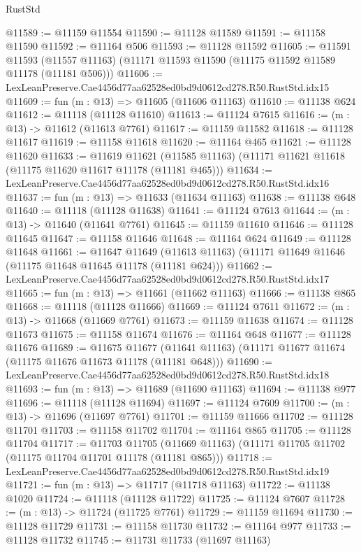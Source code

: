 \begin{lexlean}{RustStd}
\begin{coremodule}
@11589 := @11159 @11554
@11590 := @11128 @11589
@11591 := @11158 @11590
@11592 := @11164 @506
@11593 := @11128 @11592
@11605 := @11591
    @11593
    (@11557 @11163)
    (@11171 @11593 @11590 (@11175 @11592 @11589 @11178 (@11181 @506)))
@11606 := LexLeanPreserve.Cae4456d77aa62528ed0bd9d0612cd278.R50.RustStd.idx15
@11609 := fun (m : @13) => @11605 (@11606 @11163)
@11610 := @11138 @624
@11612 := @11118 (@11128 @11610)
@11613 := @11124 @7615
@11616 := (m : @13) -> @11612 (@11613 @7761)
@11617 := @11159 @11582
@11618 := @11128 @11617
@11619 := @11158 @11618
@11620 := @11164 @465
@11621 := @11128 @11620
@11633 := @11619
    @11621
    (@11585 @11163)
    (@11171 @11621 @11618 (@11175 @11620 @11617 @11178 (@11181 @465)))
@11634 := LexLeanPreserve.Cae4456d77aa62528ed0bd9d0612cd278.R50.RustStd.idx16
@11637 := fun (m : @13) => @11633 (@11634 @11163)
@11638 := @11138 @648
@11640 := @11118 (@11128 @11638)
@11641 := @11124 @7613
@11644 := (m : @13) -> @11640 (@11641 @7761)
@11645 := @11159 @11610
@11646 := @11128 @11645
@11647 := @11158 @11646
@11648 := @11164 @624
@11649 := @11128 @11648
@11661 := @11647
    @11649
    (@11613 @11163)
    (@11171 @11649 @11646 (@11175 @11648 @11645 @11178 (@11181 @624)))
@11662 := LexLeanPreserve.Cae4456d77aa62528ed0bd9d0612cd278.R50.RustStd.idx17
@11665 := fun (m : @13) => @11661 (@11662 @11163)
@11666 := @11138 @865
@11668 := @11118 (@11128 @11666)
@11669 := @11124 @7611
@11672 := (m : @13) -> @11668 (@11669 @7761)
@11673 := @11159 @11638
@11674 := @11128 @11673
@11675 := @11158 @11674
@11676 := @11164 @648
@11677 := @11128 @11676
@11689 := @11675
    @11677
    (@11641 @11163)
    (@11171 @11677 @11674 (@11175 @11676 @11673 @11178 (@11181 @648)))
@11690 := LexLeanPreserve.Cae4456d77aa62528ed0bd9d0612cd278.R50.RustStd.idx18
@11693 := fun (m : @13) => @11689 (@11690 @11163)
@11694 := @11138 @977
@11696 := @11118 (@11128 @11694)
@11697 := @11124 @7609
@11700 := (m : @13) -> @11696 (@11697 @7761)
@11701 := @11159 @11666
@11702 := @11128 @11701
@11703 := @11158 @11702
@11704 := @11164 @865
@11705 := @11128 @11704
@11717 := @11703
    @11705
    (@11669 @11163)
    (@11171 @11705 @11702 (@11175 @11704 @11701 @11178 (@11181 @865)))
@11718 := LexLeanPreserve.Cae4456d77aa62528ed0bd9d0612cd278.R50.RustStd.idx19
@11721 := fun (m : @13) => @11717 (@11718 @11163)
@11722 := @11138 @1020
@11724 := @11118 (@11128 @11722)
@11725 := @11124 @7607
@11728 := (m : @13) -> @11724 (@11725 @7761)
@11729 := @11159 @11694
@11730 := @11128 @11729
@11731 := @11158 @11730
@11732 := @11164 @977
@11733 := @11128 @11732
@11745 := @11731
    @11733
    (@11697 @11163)

\end{coremodule}
\end{lexlean}
